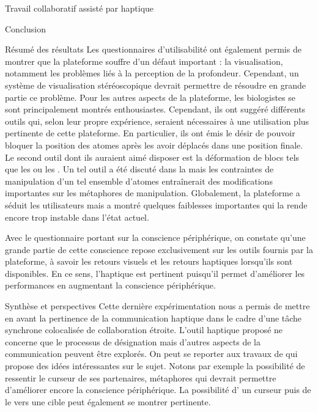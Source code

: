 \documentclass[myfrancais,ngerman,english,french]{mythesis}
\begin{document}
\begin{mychapter}{Travail collaboratif assisté par haptique}
\begin{mysection}{Conclusion}
\begin{mysubsection}{Résumé des résultats}
				Les questionnaires d'utilisabilité ont également permis de montrer que la plateforme souffre d'un défaut important : la visualisation, notamment les problèmes liés à la perception de la profondeur.
				Cependant, un système de visualisation stéréoscopique devrait permettre de résoudre en grande partie ce problème.
				Pour les autres aspects de la plateforme, les biologistes se sont principalement montrés enthousiastes.
				Cependant, ils ont suggéré différents outils qui, selon leur propre expérience, seraient nécessaires à une utilisation plus pertinente de cette plateforme.
				En particulier, ils ont émis le désir de pouvoir bloquer la position des atomes après les avoir déplacés dans une position finale.
				Le second outil dont ils auraient aimé disposer est la déformation de blocs tels que les \myhelice* ou les \myfeuillet*.
				Un tel outil a été discuté dans la  mais les contraintes de manipulation d'un tel ensemble d'atomes entraînerait des modifications importantes sur les métaphores de manipulation.
				Globalement, la plateforme a séduit les utilisateurs mais a montré quelques faiblesses importantes qui la rende encore trop instable dans l'état actuel.

				Avec le questionnaire portant sur la conscience périphérique, on constate qu'une grande partie de cette conscience repose exclusivement sur les outils fournis par la plateforme, à savoir les retours visuels et les retours haptiques lorsqu'ils sont disponibles.
				En ce sens, l'haptique est pertinent puisqu'il permet d'améliorer les performances en augmentant la conscience périphérique.
			\end{mysubsection}
			\begin{mysubsection}{Synthèse et perspectives}
				Cette dernière expérimentation nous a permis de mettre en avant la pertinence de la communication haptique dans le cadre d'une tâche synchrone colocalisée de collaboration étroite.
				L'outil haptique proposé ne concerne que le processus de désignation mais d'autres aspects de la communication peuvent être explorés.
				On peut se reporter aux travaux de  qui propose des idées intéressantes sur le sujet.
				Notons par exemple la possibilité de ressentir le curseur de ses partenaires, métaphores qui devrait permettre d'améliorer encore la conscience périphérique.
				La possibilité d' un curseur puis de le  vers une cible peut également se montrer pertinente.


\end{mysubsection}
\end{mysection}
\end{mychapter}
\end{document}

